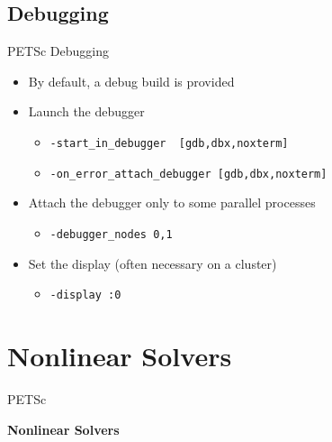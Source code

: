 \subsection{Debugging}
\begin{frame}[fragile]{PETSc Debugging}
  \begin{itemize}
  \item By default, a debug build is provided

  \vspace*{0.3cm}
  \item Launch the debugger
  \begin{itemize}
    \item \lstinline|-start_in_debugger  [gdb,dbx,noxterm]|
    \item \lstinline|-on_error_attach_debugger [gdb,dbx,noxterm]|
  \end{itemize}

  \vspace*{0.3cm}
  \item Attach the debugger only to some parallel processes
  \begin{itemize}
    \item \lstinline|-debugger_nodes 0,1|
  \end{itemize}

  \vspace*{0.3cm}
  \item Set the display (often necessary on a cluster)
  \begin{itemize}
    \item \lstinline|-display :0|
  \end{itemize}
\end{itemize}
\end{frame}  












%
%
\section{Nonlinear Solvers}
\begin{frame}{PETSc}
   \begin{center} \Large \textbf{Nonlinear Solvers} \end{center}
\end{frame}


